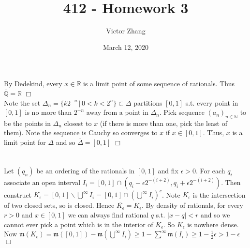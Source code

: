 \documentclass{article}
\title{412 - Homework 3}
\author{Victor Zhang }
\date{March 12, 2020}
\begin{document}
\maketitle

\section{}
By Dedekind, every $x \in \mathbb{R}$ is a limit point of some sequence of rationals. Thus $\overline{\mathbb{Q}} = \mathbb{R}$ $\Box$\\
Note the set $\Delta_n = \{k2^{-n} \,|\, 0 < k < 2^n\} \subset \Delta$ partitions $[0,1]$ s.t. every point in $[0,1]$ is no more than $2^{-n}$ away from a point in $\Delta_n$. Pick sequence $(a_n)_{n \in \mathbb{N}}$ to be the points in $\Delta_n$ closest to $x$ (if there is more than one, pick the least of them). Note the sequence is Cauchy so converges to $x$ if $x \in [0,1]$. Thus, $x$ is a limit point for $\Delta$ and so $\overline{\Delta} = [0,1]$ $\Box$

\section{}
Let $(q_n)$ be an ordering of the rationals in $[0,1]$ and fix $\epsilon > 0$. For each $q_i$ associate an open interval $I_i = [0,1] \cap (q_i - \epsilon 2^{-(i+2)}, q_i + \epsilon 2^{-(i+2)})$. Then construct $K_\epsilon = [0,1] \backslash \bigcup\limits^\infty I_i = [0,1] \cap \left(\bigcup\limits^\infty I_i \right)^c$. Note $K_\epsilon$ is the intersection of two closed sets, so is closed. Hence $\overline{K_\epsilon} = K_\epsilon$. By density of rationals, for every $r>0$ and $x\in [0,1]$ we can always find rational $q$ s.t. $|x-q| < r$ and so we cannot ever pick a point which is in the interior of $K_\epsilon$. So $K_\epsilon$ is nowhere dense. Now $\mathfrak{m}(K_\epsilon) = \mathfrak{m}([0,1]) - \mathfrak{m}(\bigcup\limits^\infty I_i) \geq 1 - \sum\limits^\infty \mathfrak{m}(I_i) \geq 1 - \frac{1}{2}\epsilon > 1- \epsilon$ $\Box$

\section{}
\end{document}
